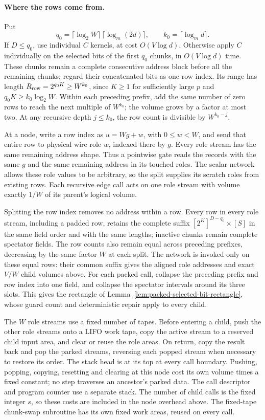 \paragraph{Where the rows come from.}
Put
\[
 q_0=\lceil\log_2 W\rceil\,
       \lceil\log_m(2d)\rceil,
 \qquad k_0=\lceil\log_m d\rceil.
\]
If \(D\le q_0\), use individual \(C\) kernels, at cost \(O(V\log d)\).
Otherwise apply \(C\) individually on the selected bits of the first
\(q_0\) chunks, in \(O(V\log d)\) time.  These chunks remain a
complete consecutive address block before all the remaining chunks;
regard their concatenated bits as one row index.  Its range has
length \(R_{\rm row}=2^{q_0K}\ge W^{k_0}\), since \(K\ge1\) for sufficiently
large \(p\) and \(q_0K\ge k_0\log_2W\).  Within each preceding prefix, add
the same number of zero rows to reach the next multiple of \(W^{k_0}\);
the volume grows
by a factor at most two.  At any recursive depth \(j\le k_0\), the
row count is divisible by \(W^{k_0-j}\).

At a node, write a row index as \(u=Wg+w\), with \(0\le w<W\),
and send that entire row to physical wire role \(w\), indexed there
by \(g\).  Every role stream has the same remaining address shape.
Thus a pointwise gate reads the records with the same \(g\) and the
same remaining address in its touched roles.  The scalar network
allows these role values to be arbitrary, so the split supplies its
scratch roles from existing rows.  Each recursive edge call acts on
one role stream with volume exactly \(1/W\) of its parent's logical
volume.

Splitting the row index removes no address within a row. Every row in
every role stream, including a padded row, retains the complete suffix
\([2^K]^{D-q_0}\times[S]\) in the same field order and with the same
lengths; inactive chunks remain complete spectator fields. The row
counts also remain equal across preceding prefixes, decreasing by
the same factor \(W\) at each split. The network is invoked only on
these equal rows: their common suffix gives the aligned role addresses
and exact \(V/W\) child volumes above. For each packed call, collapse
the preceding prefix and row index into one field, and collapse the
spectator intervals around its three slots. This gives the rectangle of
Lemma~\ref{lem:packed-selected-bit-rectangle}, whose guard count and
deterministic repair apply to every child.

The \(W\) role streams use a fixed number of tapes.  Before entering a
child, push the other role streams onto a LIFO work tape, copy the
active stream to a reserved child input area, and clear or reuse the
role areas.  On return, copy the result back and pop the parked
streams, reversing each popped stream when necessary to restore its
order.  The stack head is at its top at every call boundary.  Pushing,
popping, copying, resetting and clearing at this node cost its own
volume times a fixed constant; no step traverses an ancestor's parked
data.  The call descriptor and program counter use a separate stack.
The number of child calls is the fixed integer \(s\), so these costs
are included in the node overhead above.  The fixed-tape chunk-swap
subroutine has its own fixed work areas, reused on every call.

